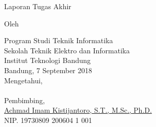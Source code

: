 \clearpage
\pagestyle{plain}

\begin{center}
\smallskip

    \Large \bfseries \MakeUppercase{\thetitle}
    \vfill

    \Large Laporan Tugas Akhir
    \vfill

    \large Oleh

    \Large \theauthor

    \large Program Studi Teknik Informatika \\
    \normalsize \normalfont
    Sekolah Teknik Elektro dan Informatika \\
    Institut Teknologi Bandung \\

    \vfill
    \normalsize \normalfont
    Bandung, 7 September 2018 \\
    Mengetahui, \\~\\

    \vspace{0.6 cm}
    Pembimbing, \\

    \vspace{2 cm}
    \underline{Achmad Imam Kistijantoro, S.T., M.Sc., Ph.D.} \\
    NIP. 19730809 200604 1 001 \\

\end{center}
\clearpage
